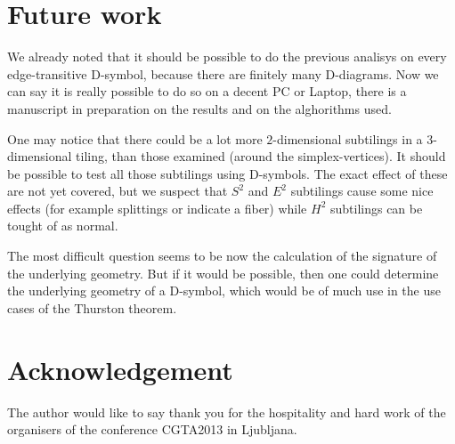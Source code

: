 \documentclass[12pt,a4paper]{article}
\numberwithin{equation}{section}
\theoremstyle{plain}%
\theoremstyle{definition}
\theoremstyle{remark}
\begin{document}
\section{Future work}
We already noted that it should be possible to do the previous analisys on every
edge-transitive D-symbol, because there are finitely many D-diagrams. Now we can
say it is really possible to do so on a decent PC or Laptop, there is a
manuscript in preparation on the results and on the alghorithms used.

One may notice that there could be a lot more $2$-dimensional subtilings in a
$3$-dimensional tiling, than those examined (around the simplex-vertices). It
should be possible to test all those subtilings using D-symbols. The exact
effect of these are not yet covered, but we suspect that $S^2$ and $E^2$
subtilings cause some nice effects (for example splittings or indicate a fiber)
while $H^2$ subtilings can be tought of as normal.

The most difficult question seems to be now the calculation of the signature of
the underlying geometry. But if it would be possible, then one could determine
the underlying geometry of a D-symbol, which would be of much use in the use
cases of the Thurston theorem.

\section{Acknowledgement}
The author would like to say thank you for the hospitality and hard work of the
organisers of the conference CGTA2013 in Ljubljana.

\nocite{DHM93,D87,Du88,H93,LM90,Ma67,M94,T82,VS93,F94,M11,DDH98,K11,LMS94}


\end{document}
